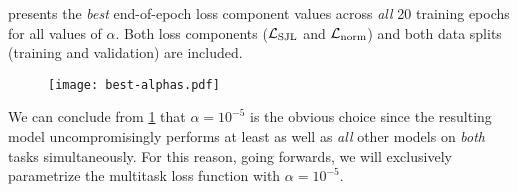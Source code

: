  presents the \emph{best} end-of-epoch loss component values across \textit{all} 20 training epochs for all values of $\alpha$.
Both loss components ($\mathcal{L}_{\mathrm{SJL}}$ and $\mathcal{L}_{\mathrm{norm}}$) and both data splits (training and validation) are included.
\begin{figure}[H]
  \centering
  \texttt{[image: best-alphas.pdf]}
  \label{fig:best-epoch}
\end{figure}
\noindent
We can conclude from \cref{fig:best-epoch} that $\alpha = 10^{-5}$ is the obvious choice since the resulting model uncompromisingly performs at least as well as \emph{all} other models on \emph{both} tasks simultaneously.
For this reason, going forwards, we will exclusively parametrize the multitask loss function with $\alpha = 10^{-5}$.

